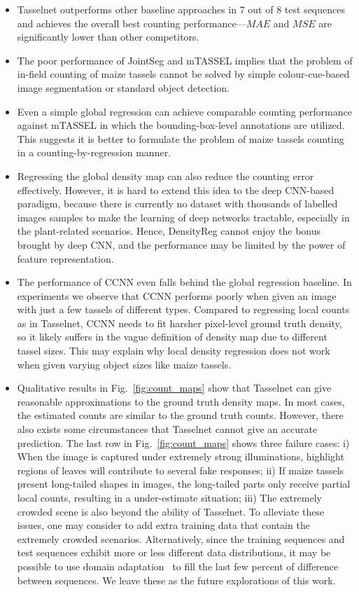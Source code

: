 \documentclass[twocolumn]{bmcart}%
\begin{document}
\begin{itemize}
	\item Tasselnet outperforms other baseline approaches in $7$ out of $8$ test sequences and achieves the overall best counting performance---$MAE$ and $MSE$ are significantly lower than other competitors.
	\item The poor performance of JointSeg and mTASSEL implies that the problem of in-field counting of maize tassels cannot be solved by simple colour-cue-based image segmentation or standard object detection.
	\item Even a simple global regression can achieve comparable counting performance against mTASSEL in which the bounding-box-level annotations are utilized. This suggests it is better to formulate the problem of maize tassels counting in a counting-by-regression manner.
	\item Regressing the global density map can also reduce the counting error effectively. However, it is hard to extend this idea to the deep CNN-based paradigm, because there is currently no dataset with thousands of labelled images samples to make the learning of deep networks tractable, especially in the plant-related scenarios. Hence, DensityReg cannot enjoy the bonus brought by deep CNN, and the performance may be limited by the power of feature representation.
	\item The performance of CCNN even falls behind the global regression baseline. In experiments we observe that CCNN performs poorly when given an image with just a few tassels of different types. Compared to regressing local counts as in Tasselnet, CCNN needs to fit harsher pixel-level ground truth density, so it likely suffers in the vague definition of density map due to different tassel sizes. This may explain why local density regression does not work when given varying object sizes like maize tassels.
	\item Qualitative results in Fig.~\ref{fig:count_maps} show that Tasselnet can give reasonable approximations to the ground truth density maps. In most cases, the estimated counts are similar to the ground truth counts. However, there also exists some circumstances that Tasselnet cannot give an accurate prediction. The last row in Fig.~\ref{fig:count_maps} shows three failure cases: i) When the image is captured under extremely strong illuminations, highlight regions of leaves will contribute to several fake responses; ii) If maize tassels present long-tailed shapes in images, the long-tailed parts only receive partial local counts, resulting in a under-estimate situation; iii) The extremely crowded scene is also beyond the ability of Tasselnet. To alleviate these issues, one may consider to add extra training data that contain the extremely crowded scenarios. Alternatively, since the training sequences and test sequences exhibit more or less different data distributions, it may be possible to use domain adaptation~\cite{Lu2017} to fill the last few percent of difference between sequences. We leave these as the future explorations of this work.
\end{itemize}
\end{document}
